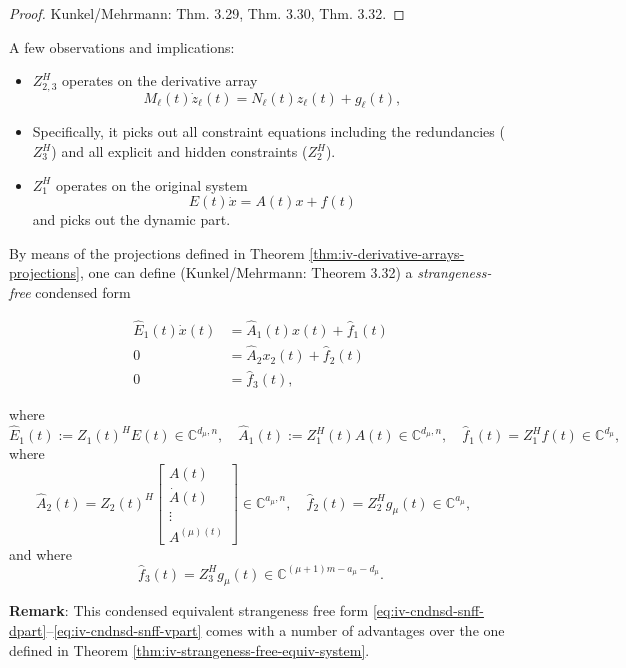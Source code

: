 \documentclass[]{book}
\theoremstyle{definition}
\theoremstyle{definition}
\theoremstyle{definition}
\theoremstyle{definition}
\theoremstyle{remark}
\begin{document}
\begin{proof}
{}Kunkel/Mehrmann: Thm. 3.29, Thm. 3.30, Thm. 3.32.
\end{proof}

A few observations and implications:

\begin{itemize}
\item
  \(Z_{2,3}^H\) operates on the derivative array
  \[
    M_\ell (t) \dot z_\ell(t) = N_\ell (t) z_\ell(t) + g_\ell(t),
  \]
\item
  Specifically, it picks out all constraint equations including the redundancies (\(Z_3^H\)) and all explicit and hidden constraints (\(Z_2^H\)).
\item
  \(Z_1^H\) operates on the original system
  \[
  E(t)\dot x = A(t)x + f(t)
  \]
  and picks out the dynamic part.
\end{itemize}

By means of the projections defined in Theorem \ref{thm:iv-derivative-arrays-projections}, one can define (Kunkel/Mehrmann: Theorem 3.32) a \emph{strangeness-free} condensed form

\begin{align}
\hat E_1(t) \dot x(t) &= \hat A_{1}(t)x(t) + \hat f_1(t) \label{eq:iv-cndnsd-snff-dpart} \\
0 &= \hat A_2 x_2(t) + \hat f_2(t) \label{eq:iv-cndnsd-snff-apart}\\
0 &= \hat f_3(t), \label{eq:iv-cndnsd-snff-vpart}
\end{align}

where
\[
\hat E_1(t) := Z_1(t)^HE(t) \in \mathbb C^{d_\mu, n}, \quad \hat A_1(t) := Z_1^H(t)A (t)\in \mathbb C^{d_\mu, n}, \quad \hat f_1(t) = Z_1^Hf(t) \in \mathbb C^{d_\mu},
\]
where
\[
\hat A_2(t) = Z_2(t)^H
     \begin{bmatrix}
     A(t) \\ \dot A(t) \\ \vdots \\ A^{(\mu)(t)}
     \end{bmatrix}
\in \mathbb C^{a_\mu, n}, 
\quad
\hat f_2(t) = Z_2^Hg_\mu(t) \in \mathbb C^{a_\mu},
\quad
\]
and where
\[
\hat f_3(t) = Z_3^Hg_\mu(t) \in \mathbb C^{(\mu+1)m-a_\mu-d_\mu}.
\]

\textbf{Remark}: This condensed equivalent strangeness free form \eqref{eq:iv-cndnsd-snff-dpart}--\eqref{eq:iv-cndnsd-snff-vpart} comes with a number of advantages over the one defined in Theorem \ref{thm:iv-strangeness-free-equiv-system}.
\end{document}
